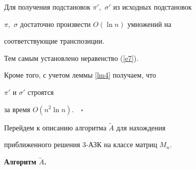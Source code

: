 Для получения подстановок $\pi'$,~$\sigma'$ из исходных подстановок


$\pi$,~$\sigma$ достаточно произвести $O(\ln n)$ умножений на 


соответствующие транспозиции.


Тем самым установлено неравенство (\ref{e7}). 


Кроме того, с учетом леммы \ref{lm4} получаем, что


$\pi'$ и $\sigma'$ строятся 


за время $O(n^2 \ln n).\quad\square$


\medskip





Перейдем к описанию алгоритма $\widetilde A$ для нахождения 


приближенного решения 3-АЗК на классе матриц $M_n$.


\medskip





{\bf Алгоритм $\widetilde A$.}


